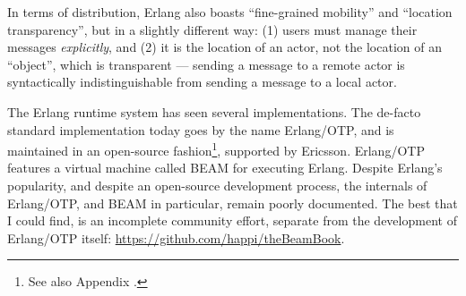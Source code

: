 In terms of distribution, Erlang also boasts ``fine-grained mobility''
and ``location transparency'', but in a slightly different way: (1)
users must manage their messages \emph{explicitly}, and (2) it is the
location of an actor, not the location of an ``object'', which is
transparent --- sending a message to a remote actor is syntactically
indistinguishable from sending a message to a local actor.

The Erlang runtime system has seen several
implementations\cite{erlang:2018:The-Erlang-Runtime-System}. The
de-facto standard implementation today goes by the name Erlang/OTP,
and is maintained in an open-source fashion\footnote{See also Appendix
.}, supported by Ericsson.
Erlang/OTP features a virtual machine called BEAM for executing
Erlang. Despite Erlang's popularity, and despite an open-source
development process, the internals of Erlang/OTP, and BEAM in
particular, remain poorly documented. The best that I could find, is
an incomplete community effort, separate from the development of
Erlang/OTP itself: \url{https://github.com/happi/theBeamBook}.



